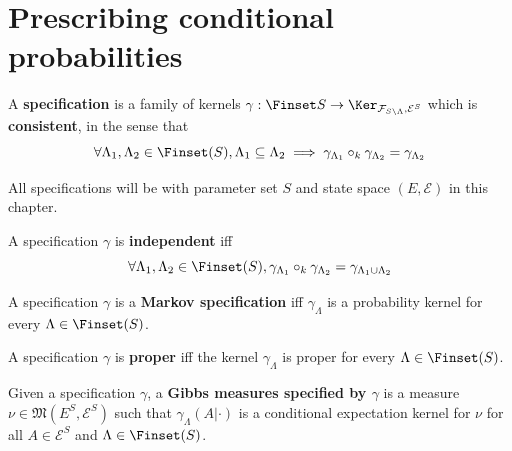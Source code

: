 \section{Prescribing conditional probabilities}

\begin{definition}[Specification]
    \label{def:spec}
    \leanok{}

    A {\bf specification} is a family of kernels $\gamma : \Finset S \to \Ker_{\mathcal{F}_{S\setminus\Lambda}, \mathcal{E}^S}$ which is {\bf consistent}, in the sense that
    \[\forall \Lambda_1, \Lambda_2 \in \Finset(S), \Lambda_1 \subseteq \Lambda_2 \implies \gamma_{\Lambda_1} \circ_k \gamma_{\Lambda_2} = \gamma_{\Lambda_2}\]
\end{definition}

All specifications will be with parameter set $S$ and state space $(E, \mathcal{E})$ in this chapter.

\begin{definition}
    \label{def:indep-spec}
    \leanok{}

    A specification $\gamma$ is \textbf{independent} iff
    \[\forall \Lambda_1, \Lambda_2 \in \Finset(S), \gamma_{\Lambda_1} \circ_k \gamma_{\Lambda_2} = \gamma_{\Lambda_1\cup\Lambda_2}\]
\end{definition}

\begin{definition}
    \label{def:markov-spec}
    \leanok{}

    A specification $\gamma$ is a \textbf{Markov specification} iff $\gamma_\Lambda$ is a probability kernel for every $\Lambda \in \Finset(S)$.
\end{definition}

\begin{definition}
    \label{def:proper-spec}
    \leanok{}

    A specification $\gamma$ is \textbf{proper} iff the kernel $\gamma_\Lambda$ is proper for every $\Lambda \in \Finset(S)$.
\end{definition}

\begin{definition}
    \label{def:gibbs-meas}
    \leanok
    Given a specification $\gamma$, a \textbf{Gibbs measures specified by $\gamma$} is a measure $\nu \in \mathfrak{M}(E^S, \mathcal{E}^S)$ such that $\gamma_\Lambda(A|\cdot)$ is a conditional expectation kernel for $\nu$ for all $A \in \mathcal E^S$ and $\Lambda \in \Finset(S)$.
\end{definition}

